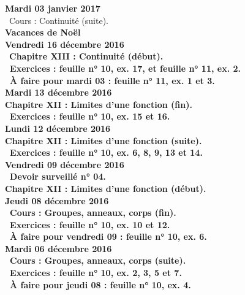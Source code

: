 \documentclass[12pt,a4paper]{article}
\begin{document}
\noindent\textbf{Mardi 03 janvier 2017} \\
\bu\ Cours : Continuité (suite).\vspace{.4cm}\\
 
\noindent\textbf{\bf Vacances de Noël}\\

\noindent\textbf{Vendredi 16 décembre 2016}\\
\bu\ \bf Chapitre XIII \rm : Continuité (début).\\
\bu\ Exercices : feuille n° 10, ex. 17, et feuille n° 11, ex. 2.\\
\bu\ À faire pour mardi 03 : feuille n° 11, ex. 1 et 3.\vspace{.4cm}\\

\noindent\textbf{Mardi 13 décembre 2016} \\
\bf Chapitre XII \rm : Limites d'une fonction (fin).\\
\bu\ Exercices : feuille n° 10, ex. 15 et 16.\vspace{.4cm}\\

\noindent\textbf{Lundi 12 décembre 2016} \\
\bf Chapitre XII \rm : Limites d'une fonction (suite).\\
\bu\ Exercices : feuille n° 10, ex. 6, 8, 9, 13 et 14.\vspace{.4cm}\\
  
\noindent\textbf{Vendredi 09 décembre 2016}\\
\bu\ Devoir surveillé n° 04.\\
\bf Chapitre XII \rm : Limites d'une fonction (début).\vspace{.4cm}\\

\noindent\textbf{Jeudi 08 décembre 2016}\\
\bu\ Cours : Groupes, anneaux, corps (fin).\\
\bu\ Exercices : feuille n° 10, ex. 10 et 12.\\
\bu\ À faire pour vendredi 09 : feuille n° 10, ex. 6.\vspace{.4cm}\\

\noindent\textbf{Mardi 06 décembre 2016} \\
\bu\ Cours : Groupes, anneaux, corps (suite).\\
\bu\ Exercices : feuille n° 10, ex. 2, 3, 5 et 7.\\
\bu\ À faire pour jeudi 08 : feuille n° 10, ex. 4.\vspace{.4cm}\\
\end{document}
